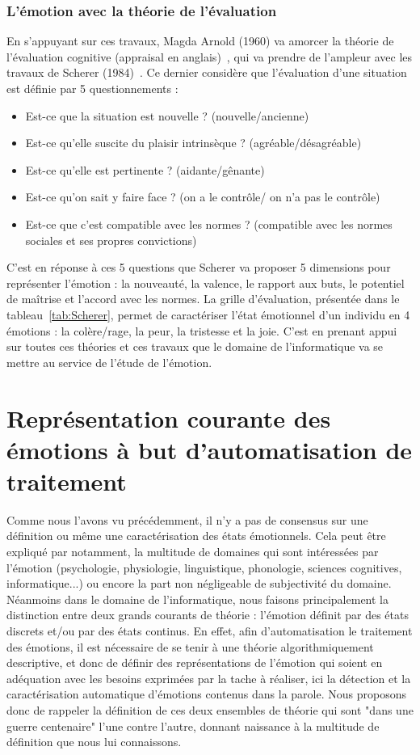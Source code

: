 \subsubsection{L'émotion avec la théorie de l'évaluation}
En s'appuyant sur ces travaux, Magda Arnold (1960) va amorcer la théorie de l'évaluation cognitive (appraisal en anglais)~\cite{Arnold1960}, qui va prendre de l'ampleur avec les travaux de Scherer (1984)~\cite{Scherer1984}. Ce dernier considère que l'évaluation d'une situation est définie par 5 questionnements :
\begin{itemize}
  \item Est-ce que la situation est nouvelle ? (nouvelle/ancienne)
  \item Est-ce qu'elle suscite du plaisir intrinsèque ? (agréable/désagréable)
  \item Est-ce qu'elle est pertinente ? (aidante/gênante)
  \item Est-ce qu'on sait y faire face ? (on a le contrôle/ on n'a pas le contrôle)
  \item Est-ce que c'est compatible avec les normes ? (compatible avec les normes sociales et ses propres convictions)
\end{itemize}

C'est en réponse à ces 5 questions que Scherer va proposer 5 dimensions pour représenter l'émotion : la nouveauté, la valence, le rapport aux buts, le potentiel de maîtrise et l'accord avec les normes. La grille d'évaluation, présentée dans le tableau~\ref{tab:Scherer}, permet de caractériser l'état émotionnel d'un individu en 4 émotions : la colère/rage, la peur, la tristesse et la joie.
C'est en prenant appui sur toutes ces théories et ces travaux que le domaine de l'informatique va se mettre au service de l'étude de l'émotion.



\section{Représentation courante des émotions à but d'automatisation de traitement}
Comme nous l'avons vu précédemment, il n'y a pas de consensus sur une définition ou même une caractérisation des états émotionnels. Cela peut être expliqué par notamment, la multitude de domaines qui sont intéressées par l'émotion (psychologie, physiologie, linguistique, phonologie, sciences cognitives, informatique...) ou encore la part non négligeable de subjectivité du domaine.
Néanmoins dans le domaine de l'informatique, nous faisons principalement la distinction entre deux grands courants de théorie : l'émotion définit par des états discrets et/ou par des états continus. En effet, afin d'automatisation le traitement des émotions, il est nécessaire de se tenir à une théorie algorithmiquement descriptive, et donc de définir des représentations de l'émotion qui soient en adéquation avec les besoins exprimées par la tache à réaliser, ici la détection et la caractérisation automatique d'émotions contenus dans la parole. Nous proposons donc de rappeler la définition de ces deux ensembles de théorie qui sont "dans une guerre centenaire" l'une contre l'autre, donnant naissance à la multitude de définition que nous lui connaissons.

